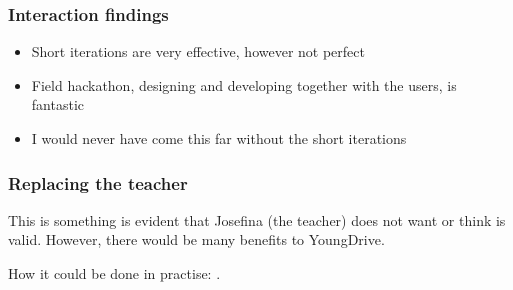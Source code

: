 \subsubsection{Interaction findings}
\begin{itemize}
\item Short iterations are very effective, however not perfect
\item Field hackathon, designing and developing together with the users, is fantastic
\item I would never have come this far without the short iterations
\end{itemize}

\subsubsection{Replacing the teacher}
This is something is evident that Josefina (the teacher) does not want or think is valid. However, there would be many benefits to YoungDrive.

How it could be done in practise: .
